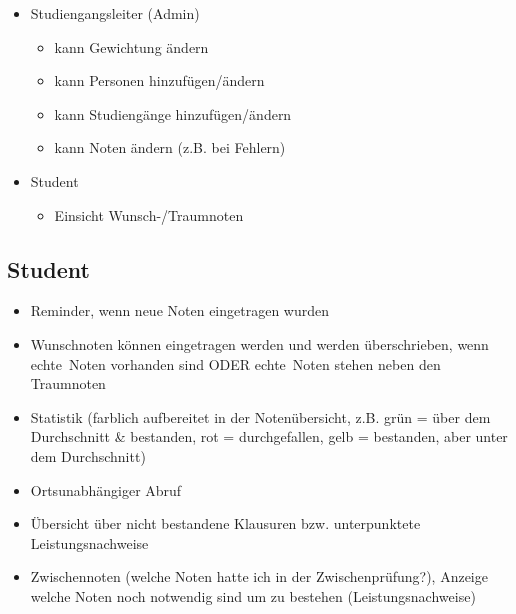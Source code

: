 \documentclass[12pt,a4paper,parskip]{scrreprt}
\begin{document}
\begin{itemize}
\begin{itemize}
\begin{itemize}
\item Studiengangsleiter (Admin)
\begin{itemize}
\item kann Gewichtung ändern
\item kann Personen hinzufügen/ändern
\item kann Studiengänge hinzufügen/ändern
\item kann Noten ändern (z.B. bei Fehlern)
\end{itemize}
\item Student
\begin{itemize}
\item Einsicht Wunsch-/Traumnoten
\end{itemize}		
\end{itemize}
\end{itemize}
\end{itemize}
\subsection{Student}
\begin{itemize}
\item Reminder, wenn neue Noten eingetragen wurden
\item Wunschnoten können eingetragen werden und werden überschrieben, wenn \glqq echte\grqq\ Noten vorhanden sind ODER \glqq echte\grqq\ Noten stehen neben den Traumnoten
\item Statistik (farblich aufbereitet in der Notenübersicht, z.B. grün = über dem Durchschnitt \& bestanden, rot = durchgefallen, gelb = bestanden, aber unter dem Durchschnitt)
\item Ortsunabhängiger Abruf
\item Übersicht über nicht bestandene Klausuren bzw. unterpunktete Leistungsnachweise
\item Zwischennoten (welche Noten hatte ich in der Zwischenprüfung?), Anzeige welche Noten noch notwendig sind um zu bestehen (Leistungsnachweise)
\end{itemize}
\end{document}
